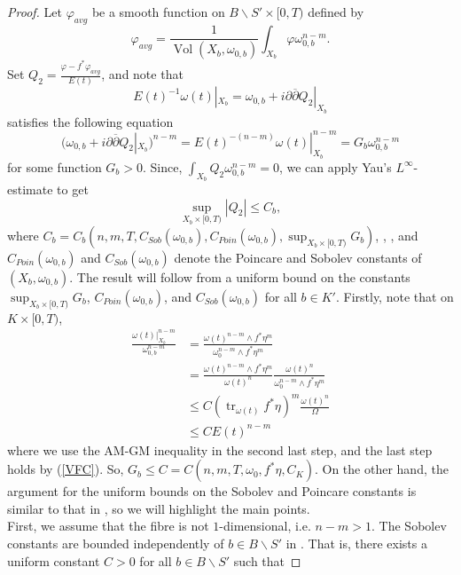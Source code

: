 \documentclass[12pt]{article}
\numberwithin{equation}{section}
\renewcommand{\d}{\partial}
\newcommand{\dbar}{\overline{\partial}}
\DeclareMathOperator{\tr}{tr}
\DeclareMathOperator{\Vol}{Vol}
\begin{document}
\begin{proof}
Let $\varphi_{avg}$ be a smooth function on $B\backslash S' \times [0,T)$ defined by
\begin{equation*}
    \varphi_{avg} = \frac{1}{\Vol(X_b,\omega_{0,b})} \int_{X_b} \varphi \omega_{0,b}^{n-m}.
\end{equation*}
Set $Q_2 = \frac{\varphi - f^* \varphi_{avg}}{E(t)}$, and note that 
\begin{equation*}
    E(t)^{-1}\omega(t)|_{X_b} = \omega_{0,b} + i\d\dbar Q_2|_{X_b}
\end{equation*}
satisfies the following equation
\begin{equation*}
    (\omega_{0,b} + i\d\dbar Q_2|_{X_b})^{n-m} = E(t)^{-(n-m)} \omega(t)|_{X_b}^{n-m} = G_b \omega_{0,b}^{n-m}
\end{equation*}
for some function $G_b > 0$. Since, $\int_{X_b} Q_2 \omega_{0,b}^{n-m}= 0$, we can apply Yau's $L^\infty$-estimate to get
\begin{equation*}
    \sup_{X_b \times [0,T)} |Q_2| \leq C_b,
\end{equation*}
where $C_b = C_b(n,m, T, C_{Sob}(\omega_{0,b}), C_{Poin}(\omega_{0,b}), \sup_{X_b \times [0,T)} G_b)$, \cite{Y78}, \cite[Thm. 3]{PSS12}, and $C_{Poin}(\omega_{0,b})$ and $C_{Sob}(\omega_{0,b})$ denote the Poincare and Sobolev constants of $(X_b, \omega_{0,b})$. The result will follow from a uniform bound on the constants $\sup_{X_b \times [0,T)} G_b$, $C_{Poin}(\omega_{0,b})$, and $C_{Sob}(\omega_{0,b})$ for all $b \in K'$. Firstly, note that on $K \times [0,T)$,
\begin{align*}
    \frac{\omega(t)|_{X_b}^{n-m}}{\omega_{0,b}^{n-m}} &= \frac{\omega(t)^{n-m} \wedge f^* \eta^m}{\omega_0^{n-m} \wedge f^* \eta ^m}\\
    &=\frac{\omega(t)^{n-m} \wedge f^* \eta^m}{\omega(t)^n} \frac{\omega(t)^n}{\omega_0^{n-m} \wedge f^*\eta^m}\\
    &\leq C (\tr_{\omega(t)} f^* \eta)^m \frac{\omega(t)^n}{\Omega}\\
    &\leq C E(t)^{n-m}
\end{align*}
where we use the AM-GM inequality in the second last step, and the last step holds by (\ref{VFC}). So, $G_b \leq C = C(n,m,T,\omega_0, f^* \eta, C_{K})$. On the other hand, the argument for the uniform bounds on the Sobolev and Poincare constants is similar to that in \cite{T10, ZZ20, ST07}, so we will highlight the main points.\\
First, we assume that the fibre is not $1$-dimensional, i.e. $n-m > 1$. The Sobolev constants are bounded independently of $b \in B \backslash S'$ in \cite[Lem. 3.2]{T10}. That is, there exists a uniform constant $C > 0$ for all $b \in B \backslash S'$ such that

\end{proof}
\end{document}
